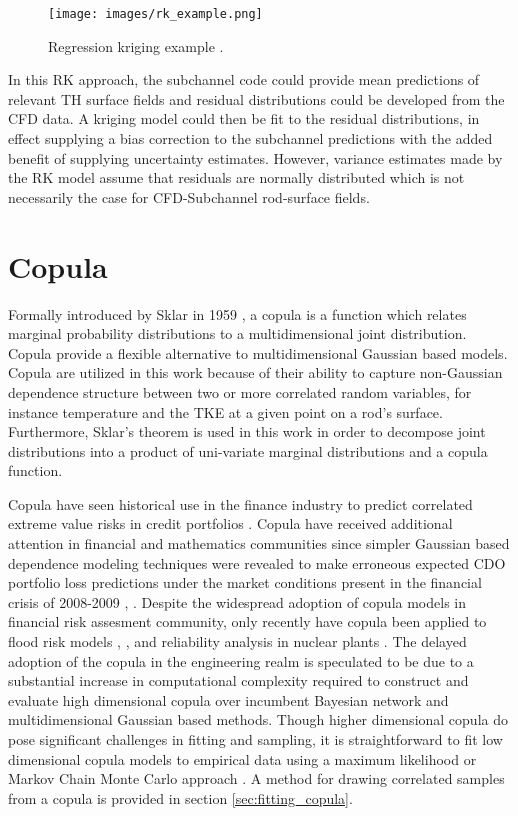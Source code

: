 \begin{figure}[hbtp]
	\centering
	\texttt{[image: images/rk\_example.png]}
	\caption[Regression kriging example.]{Regression kriging example \cite{Hengl07}.}
	\label{fit:rk}
\end{figure}

In this RK approach, the subchannel code could provide mean predictions of relevant TH surface fields and residual distributions could be developed from the CFD data.  A kriging model could then be fit to the residual distributions, in effect supplying a bias correction to the subchannel predictions with the added benefit of supplying uncertainty estimates.  However, variance estimates made by the RK model assume that residuals are normally distributed which is not necessarily the case for CFD-Subchannel rod-surface fields.


\section{Copula}

Formally introduced by Sklar in 1959 \cite{Sklar1959}, a copula is a function which relates marginal probability distributions to a multidimensional joint distribution.  Copula provide a flexible alternative to multidimensional Gaussian based models.  Copula are utilized in this work because of their ability to capture non-Gaussian dependence structure between two or more correlated random variables, for instance temperature and the TKE at a given point on a rod's surface.  Furthermore, Sklar's theorem is used in this work in order to decompose joint distributions into a product of uni-variate marginal distributions and a copula function.  

Copula have seen historical use in the finance industry to
predict correlated extreme value risks in credit portfolios
\cite{Geidosch2016}.  Copula have received additional attention in financial and mathematics communities since 
simpler Gaussian based dependence modeling techniques were revealed to make erroneous expected CDO portfolio loss predictions under the market conditions present in the financial crisis of
2008-2009 \cite{MacKenzie2013}, \cite{Li2000}.  Despite the widespread adoption of copula models in financial risk assesment community, only recently have copula been applied to flood risk
models \cite{Dupuis2007}, \cite{Ganguli2012}, and reliability analysis in nuclear plants
\cite{Kelly2007}.  The delayed adoption of the copula in the
engineering realm is speculated to be due to a substantial increase in computational
complexity required to construct and evaluate high dimensional copula over
incumbent Bayesian network and multidimensional Gaussian based methods.  
Though higher dimensional copula do pose significant challenges in fitting and sampling, it is straightforward to fit low dimensional copula models to empirical data
using a maximum likelihood or Markov Chain Monte Carlo approach \cite{Jouini1996}.
A method for drawing correlated samples from a copula is provided in section \ref{sec:fitting_copula}.
